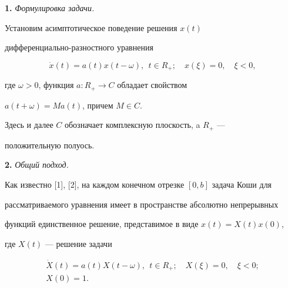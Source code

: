  


\date{} 




\pagestyle{plain} %


 




\maketitle 


\label{begin} 


 


 


 


{\bf 1.} {\it Формулировка задачи.} 


Установим асимптотическое поведение решения $x(t)$ 


диф\-фе\-рен\-ци\-аль\-но-разностного уравнения 


$$ 


\Dot x(t)=a(t)x(t-\omega),\ \ t\in R_+;\quad 


x(\xi)=0,\quad \xi<0, 


$$ 


где $\omega>0$, функция $a:R_+\to C$ обладает свойством 


$a(t+\omega)=Ma(t)$, причем $M\in C$. 


Здесь и далее $C$ обозначает комплексную плоскость, a $R_+$ --- 


положительную полуось. 


\medskip 


 


{\bf 2.} {\it Общий подход.} 


Как известно [1], [2], на каждом конечном отрезке $[0,b]$ задача Коши для 


рассматриваемого уравнения имеет в пространстве абсолютно непрерывных 


функций единственное решение, представимое в виде $x(t)=X(t)x(0)$, 


где $X(t)$ --- решение задачи 


\begin{gather*} 


\Dot X(t)=a(t)X(t-\omega),\ \ t\in R_+;\quad 


X(\xi)=0,\quad \xi<0; \\ 


X(0)=1. 


\end{gather*} 


